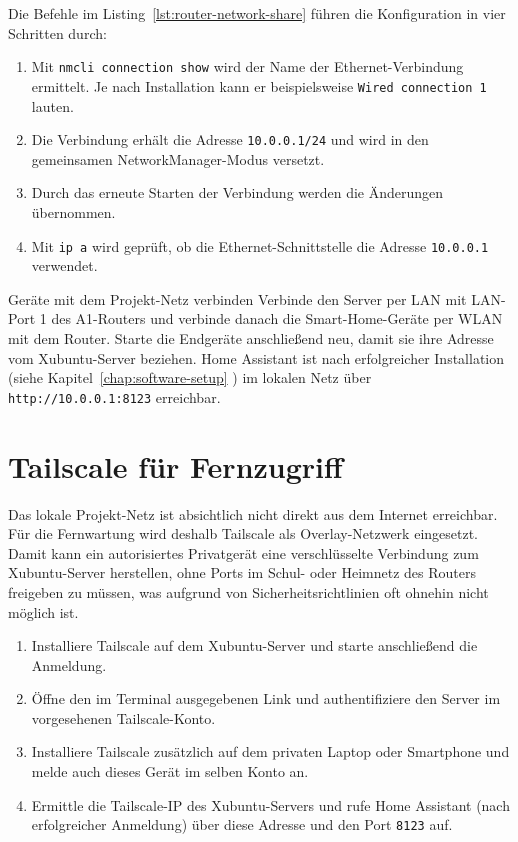 \label{lst:router-network-share}

Die Befehle im Listing~\ref{lst:router-network-share} führen die Konfiguration in vier Schritten durch:

\begin{enumerate}
    \item Mit \texttt{nmcli connection show} wird der Name der Ethernet-Verbindung ermittelt. Je nach Installation kann er beispielsweise \texttt{Wired connection 1} lauten.
    \item Die Verbindung erhält die Adresse \texttt{10.0.0.1/24} und wird in den gemeinsamen NetworkManager-Modus versetzt.
    \item Durch das erneute Starten der Verbindung werden die Änderungen übernommen.
    \item Mit \texttt{ip a} wird geprüft, ob die Ethernet-Schnittstelle die Adresse \texttt{10.0.0.1} verwendet.
\end{enumerate}

\begin{InfoBox}{Geräte mit dem Projekt-Netz verbinden}
    \scriptsize Verbinde den Server per LAN mit LAN-Port 1 des A1-Routers und verbinde danach die Smart-Home-Geräte per WLAN mit dem Router. Starte die Endgeräte anschließend neu, damit sie ihre Adresse vom Xubuntu-Server beziehen. Home Assistant ist nach erfolgreicher Installation (siehe Kapitel~\ref{chap:software-setup} \textit{}) im lokalen Netz über \texttt{http://10.0.0.1:8123} erreichbar.
\end{InfoBox}

\section{Tailscale für Fernzugriff}

Das lokale Projekt-Netz ist absichtlich nicht direkt aus dem Internet erreichbar. Für die Fernwartung wird deshalb Tailscale als Overlay-Netzwerk eingesetzt. Damit kann ein autorisiertes Privatgerät eine verschlüsselte Verbindung zum Xubuntu-Server herstellen, ohne Ports im Schul- oder Heimnetz des Routers freigeben zu müssen, was aufgrund von Sicherheitsrichtlinien oft ohnehin nicht möglich ist.


\begin{enumerate}
    \item Installiere Tailscale auf dem Xubuntu-Server und starte anschließend die Anmeldung.
    \item Öffne den im Terminal ausgegebenen Link und authentifiziere den Server im vorgesehenen Tailscale-Konto.
    \item Installiere Tailscale zusätzlich auf dem privaten Laptop oder Smartphone und melde auch dieses Gerät im selben Konto an.
    \item Ermittle die Tailscale-IP des Xubuntu-Servers und rufe Home Assistant (nach erfolgreicher Anmeldung) über diese Adresse und den Port \texttt{8123} auf.
\end{enumerate}

